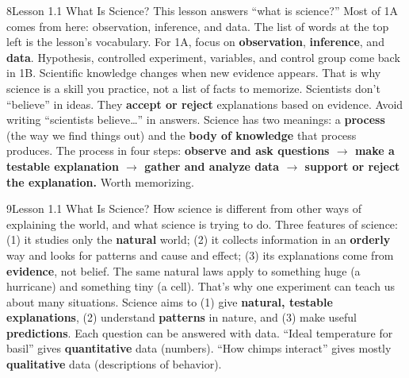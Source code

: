 \documentclass[11pt,letterpaper]{article}
\begin{document}
\begin{tbpage}{8}{Lesson 1.1 What Is Science?}
  {This lesson answers ``what is science?'' Most of 1A comes from here: observation, inference, and data. The list of words at the top left is the lesson's vocabulary.}
    {For 1A, focus on \textbf{observation}, \textbf{inference}, and \textbf{data}. Hypothesis, controlled experiment, variables, and control group come back in 1B.}
    {Scientific knowledge changes when new evidence appears. That is why science is a skill you practice, not a list of facts to memorize.}
    {Scientists don't ``believe'' in ideas. They \textbf{accept or reject} explanations based on evidence. Avoid writing ``scientists believe\dots{}'' in answers.}
    {Science has two meanings: a \textbf{process} (the way we find things out) and the \textbf{body of knowledge} that process produces.}
    {The process in four steps: \textbf{observe and ask questions $\rightarrow$ make a testable explanation $\rightarrow$ gather and analyze data $\rightarrow$ support or reject the explanation.} Worth memorizing.}
\end{tbpage}

\begin{tbpage}{9}{Lesson 1.1 What Is Science?}
  {How science is different from other ways of explaining the world, and what science is trying to do.}
    {Three features of science: (1) it studies only the \textbf{natural} world; (2) it collects information in an \textbf{orderly} way and looks for patterns and cause and effect; (3) its explanations come from \textbf{evidence}, not belief.}
    {The same natural laws apply to something huge (a hurricane) and something tiny (a cell). That's why one experiment can teach us about many situations.}
    {Science aims to (1) give \textbf{natural, testable explanations}, (2) understand \textbf{patterns} in nature, and (3) make useful \textbf{predictions}.}
    {Each question can be answered with data. ``Ideal temperature for basil'' gives \textbf{quantitative} data (numbers). ``How chimps interact'' gives mostly \textbf{qualitative} data (descriptions of behavior).}
\end{tbpage}
\end{document}
